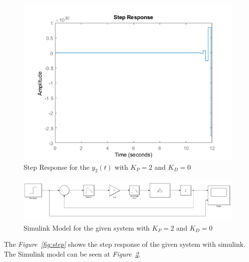 \documentclass[a4paper,12pt]{article}
\begin{document}
\begin{enumerate}
\begin{enumerate}
 			\begin{figure}[H]
 				\center
 				\setlength{\unitlength}{\textwidth} 
 				\includegraphics[width=1.0\unitlength]{images/stepy2a}
 				\caption{\label{fig:stepy2a} Step Response for the $y_2(t)$  with $K_P=2$ and $K_D=0$}
 			\end{figure}
 		
 			\begin{figure}[H]
 				\center
 				\setlength{\unitlength}{\textwidth} 
 				\includegraphics[width=1.0\unitlength]{images/simu1}
 				\caption{\label{fig:simu1} Simulink Model for the given system with $K_P=2$ and $K_D=0$}
 			\end{figure}
 		
 		The \textit{Figure~\ref{fig:step}} shows the step response of the given system  with simulink. The Simulink model can be seen at \textit{Figure~\ref{fig:simu1}}.
 		

\end{enumerate}
\end{enumerate}
\end{document}
